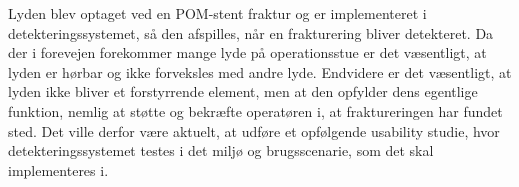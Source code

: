 Lyden blev optaget ved en POM-stent fraktur og er implementeret i detekteringssystemet, så den afspilles, når en frakturering bliver detekteret. Da der i forevejen forekommer mange lyde på operationsstue er det væsentligt, at lyden er hørbar og ikke forveksles med andre lyde. Endvidere er det væsentligt, at lyden ikke bliver et forstyrrende element, men at den opfylder dens egentlige funktion, nemlig at støtte og bekræfte operatøren i, at fraktureringen har fundet sted. Det ville derfor være aktuelt, at udføre et opfølgende usability studie, hvor detekteringssystemet testes i det miljø og brugsscenarie, som det skal implementeres i. 



